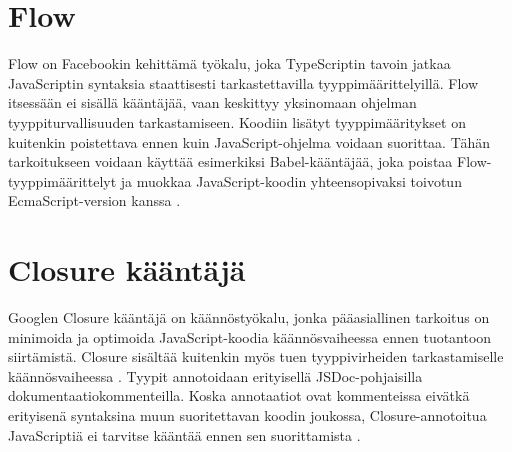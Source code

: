\section{Flow}
Flow on Facebookin kehittämä työkalu, joka TypeScriptin tavoin jatkaa
JavaScriptin syntaksia staattisesti tarkastettavilla tyyppimäärittelyillä.
Flow itsessään ei sisällä kääntäjää, vaan keskittyy yksinomaan ohjelman
tyyppiturvallisuuden tarkastamiseen. Koodiin lisätyt tyyppimääritykset on
kuitenkin poistettava ennen kuin JavaScript-ohjelma voidaan suorittaa. Tähän
tarkoitukseen voidaan käyttää esimerkiksi Babel-kääntäjää, joka poistaa
Flow-tyyppimäärittelyt ja muokkaa JavaScript-koodin yhteensopivaksi toivotun
EcmaScript-version kanssa \cite{FlowInstallation}.

\section{Closure kääntäjä}
Googlen Closure kääntäjä on käännöstyökalu, jonka pääasiallinen tarkoitus
on minimoida ja optimoida JavaScript-koodia käännösvaiheessa ennen tuotantoon
siirtämistä. Closure sisältää kuitenkin myös tuen tyyppivirheiden
tarkastamiselle käännösvaiheessa \cite{ClosureCompiler}. Tyypit annotoidaan
erityisellä JSDoc-pohjaisilla dokumentaatiokommenteilla. Koska annotaatiot
ovat kommenteissa eivätkä erityisenä syntaksina muun suoritettavan koodin
joukossa, Closure-annotoitua JavaScriptiä ei tarvitse kääntää ennen sen
suorittamista \cite{annotatingJSforClosure}.